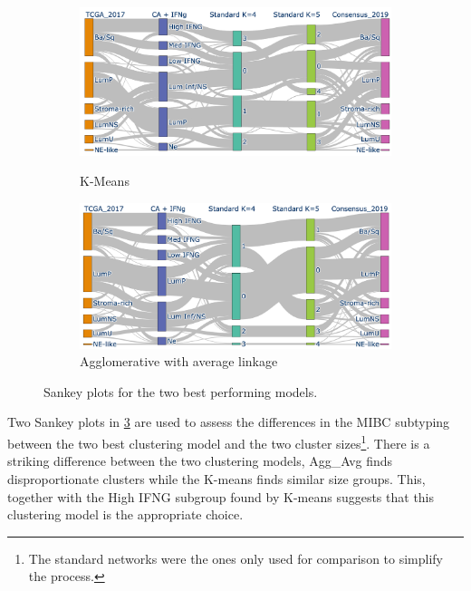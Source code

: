 \begin{figure}[!htb]
    \centering
    \begin{subfigure}[b]{0.8\textwidth}
        \includegraphics[width=\textwidth,keepaspectratio]{Sections/Network_I/Resources/P0/Sankey_KM_4K_v3.png}
        \label{fig:N_I:p0_sky_KM}
        \caption{K-Means}
    \end{subfigure}
    \begin{subfigure}[b]{0.8\textwidth}
        \includegraphics[width=\textwidth,keepaspectratio]{Sections/Network_I/Resources/P0/Sankey_Avg_4K_v3.png}
        \caption{Agglomerative with average linkage}
        \label{fig:N_I:p0_sky_AGG}
    \end{subfigure}
    \caption{Sankey plots for the two best performing models. }
    \label{fig:N_I:p0_sky_Agg_KMeans}
\end{figure}


Two Sankey plots in \cref{fig:N_I:p0_sky_Agg_KMeans} are used to assess the differences in the MIBC subtyping between the two best clustering model and the two cluster sizes\footnote{The standard networks were the ones only used for comparison to simplify the process.}. There is a striking difference between the two clustering models, Agg\_Avg finds disproportionate clusters while the K-means finds similar size groups. This, together with the High IFNG subgroup found by K-means suggests that this clustering model is the appropriate choice. 

